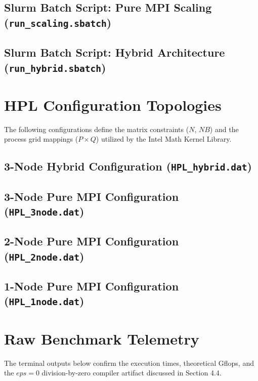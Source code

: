 \documentclass[11pt]{article}
\begin{document}
\subsection{Slurm Batch Script: Pure MPI Scaling (\texttt{run\_scaling.sbatch})}


\subsection{Slurm Batch Script: Hybrid Architecture (\texttt{run\_hybrid.sbatch})}


\newpage
\section{HPL Configuration Topologies}
The following configurations define the matrix constraints ($N$, $NB$) and the process grid mappings ($P \times Q$) utilized by the Intel Math Kernel Library.

\subsection{3-Node Hybrid Configuration (\texttt{HPL\_hybrid.dat})}


\subsection{3-Node Pure MPI Configuration (\texttt{HPL\_3node.dat})}


\subsection{2-Node Pure MPI Configuration (\texttt{HPL\_2node.dat})}


\subsection{1-Node Pure MPI Configuration (\texttt{HPL\_1node.dat})}


\newpage
\section{Raw Benchmark Telemetry}
The terminal outputs below confirm the execution times, theoretical Gflops, and the $eps=0$ division-by-zero compiler artifact discussed in Section 4.4.
\end{document}
